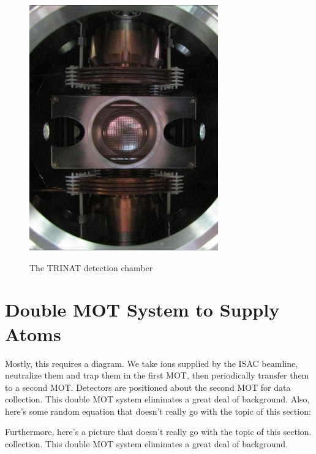 \begin{figure}[h!!!tb]
	{\includegraphics[width=.444\linewidth]{Figures/chamber_photo_2.png}}
	\caption{The TRINAT detection chamber}	
	\label{fig:thechamber}
\end{figure}



\color{black}
\section{Double MOT System to Supply Atoms}
	Mostly, 
	this requires a diagram.  We take ions supplied by the ISAC beamline, neutralize them and trap them in the first MOT, then periodically transfer them to a second MOT.  Detectors are 
	positioned about the second MOT for data 
	collection.  This double MOT system eliminates a great deal of background.  
	Also, here's some random equation that doesn't really go with the topic of this section:
	
	Furthermore, here's a picture that doesn't really go with the topic of this section.
	collection.  This double MOT system 
	eliminates a great deal of background.  
	
